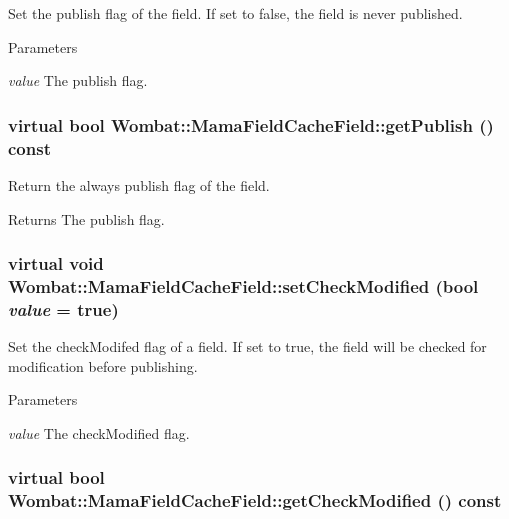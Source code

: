 Set the publish flag of the field. If set to false, the field is never published.


\begin{DoxyParams}{Parameters}
\item[{\em value}]The publish flag. \end{DoxyParams}
\hypertarget{classWombat_1_1MamaFieldCacheField_a942030403dc608070ef021df497642ab}{
\subsubsection[{getPublish}]{\setlength{\rightskip}{0pt plus 5cm}virtual bool Wombat::MamaFieldCacheField::getPublish () const}}
\label{classWombat_1_1MamaFieldCacheField_a942030403dc608070ef021df497642ab}


Return the always publish flag of the field. \begin{DoxyReturn}{Returns}
The publish flag. 
\end{DoxyReturn}
\hypertarget{classWombat_1_1MamaFieldCacheField_a7c8cf837733b67b785dfc6aa21ebec81}{
\subsubsection[{setCheckModified}]{\setlength{\rightskip}{0pt plus 5cm}virtual void Wombat::MamaFieldCacheField::setCheckModified (bool {\em value} = {\ttfamily true})}}
\label{classWombat_1_1MamaFieldCacheField_a7c8cf837733b67b785dfc6aa21ebec81}


Set the checkModifed flag of a field. If set to true, the field will be checked for modification before publishing.


\begin{DoxyParams}{Parameters}
\item[{\em value}]The checkModified flag. \end{DoxyParams}
\hypertarget{classWombat_1_1MamaFieldCacheField_a214b8aabd992ab44ca37671da73f11b1}{
\subsubsection[{getCheckModified}]{\setlength{\rightskip}{0pt plus 5cm}virtual bool Wombat::MamaFieldCacheField::getCheckModified () const}}
\label{classWombat_1_1MamaFieldCacheField_a214b8aabd992ab44ca37671da73f11b1}


